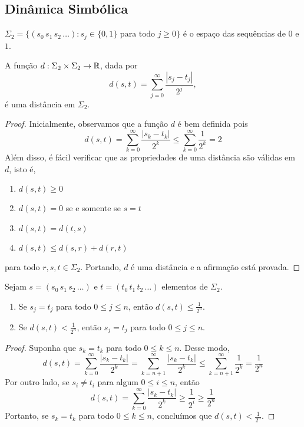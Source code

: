 \subsection{Dinâmica Simbólica}

\begin{definition}
$\Sigma_2 = \{(s_0\, s_1\, s_2\, \dots) : s_j \in \{ 0, 1 \}\text{ para todo } j \geq 0\}$ é o espaço das sequências de $0$ e $1$.
\end{definition}

\begin{proposition}
A função $d: \Sigma_2 \times \Sigma_2 \to \mathbb{R}$, dada por
$$d(s, t) = \sum_{j=0}^{\infty} \frac{|s_j - t_j|}{2^j},$$
é uma distância em $\Sigma_2$.
\end{proposition}

\begin{proof}
Inicialmente, observamos que a função $d$ é bem definida pois
$$d(s, t) = \sum_{k=0}^{\infty} \frac{|s_k - t_k|}{2^k} \leq \sum_{k=0}^{\infty} \frac{1}{2^k} = 2$$
Além disso, é fácil verificar que as propriedades de uma distância são válidas em $d$, isto é,
\begin{enumerate}[label=(\alph*)]
\item $d(s, t) \geq 0$
\item $d(s, t) = 0$ se e somente se $s = t$
\item  $d(s, t) = d(t, s)$
\item $d(s, t) \leq d(s, r) + d(r, t)$
\end{enumerate}
para todo $r, s, t \in \Sigma_2$. Portando, $d$ é uma distância e a afirmação está provada.
\end{proof}

\begin{proposition} \label{proposicao dinamicasimbolica 1}
Sejam $s = (s_0\, s_1\, s_2\, \dots)$ e $t = (t_0\, t_1\, t_2\, \dots)$ elementos de $\Sigma_2$.
\begin{enumerate}
\item Se $s_j = t_j$ para todo $0 \leq j \leq n$, então $d(s, t) \leq \frac{1}{2^n}$.
\item Se $d(s, t) < \frac{1}{2^n}$, então $s_j = t_j$ para todo $0 \leq j \leq n$.
\end{enumerate}
\end{proposition}

\begin{proof}
Suponha que $s_k = t_ k$ para todo $0 \leq k \leq n$. Desse modo, $$d(s, t) = \sum_{k=0}^{\infty} \frac{|s_k - t_k|}{2^k} = \sum_{k=n+1}^{\infty} \frac{|s_k - t_k|}{2^k} \leq \sum_{k=n+1}^{\infty} \frac{1}{2^k} = \frac{1}{2^n}$$
Por outro lado, se $s_i \neq t_i$ para algum $0 \leq i \leq n$, então $$d(s, t) = \sum_{k=0}^{\infty} \frac{|s_k - t_k|}{2^k} \geq \frac{1}{2^i} \geq \frac{1}{2^n}$$ Portanto, se $s_k = t_k$ para todo $0 \leq k \leq n$, concluímos que $d(s, t) < \frac{1}{2^n}$.
\end{proof}


